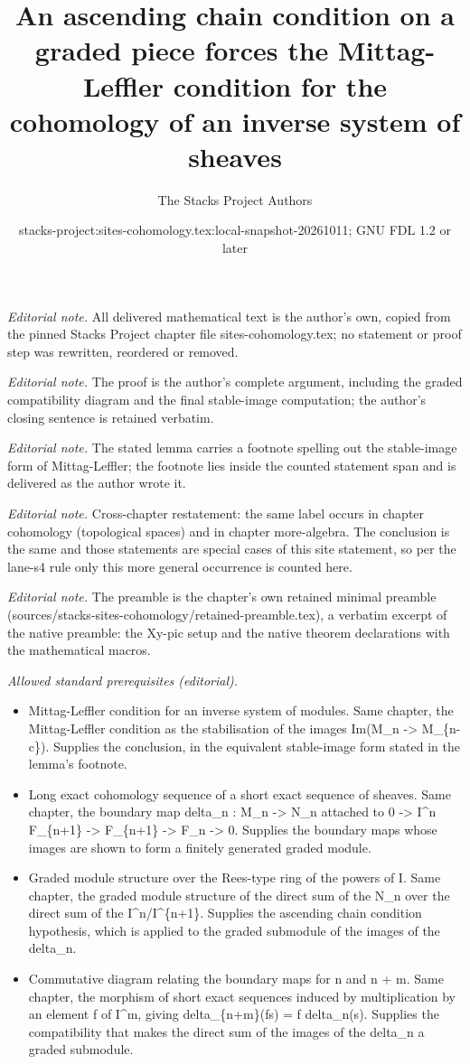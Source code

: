 \documentclass[10pt,a4paper]{amsart}
\title{An ascending chain condition on a graded piece forces the Mittag-Leffler condition for the cohomology of an inverse system of sheaves}
\author{The Stacks Project Authors}
\date{stacks-project:sites-cohomology.tex:local-snapshot-20261011; GNU FDL 1.2 or later}
\theoremstyle{plain}
\theoremstyle{definition}
\theoremstyle{remark}
\numberwithin{equation}{subsection}
\begin{document}
\maketitle
\noindent\textit{Editorial note.} All delivered mathematical text is the author's own, copied from the pinned Stacks Project chapter file sites-cohomology.tex; no statement or proof step was rewritten, reordered or removed.\par\medskip
\noindent\textit{Editorial note.} The proof is the author's complete argument, including the graded compatibility diagram and the final stable-image computation; the author's closing sentence is retained verbatim.\par\medskip
\noindent\textit{Editorial note.} The stated lemma carries a footnote spelling out the stable-image form of Mittag-Leffler; the footnote lies inside the counted statement span and is delivered as the author wrote it.\par\medskip
\noindent\textit{Editorial note.} Cross-chapter restatement: the same label occurs in chapter cohomology (topological spaces) and in chapter more-algebra. The conclusion is the same and those statements are special cases of this site statement, so per the lane-s4 rule only this more general occurrence is counted here.\par\medskip
\noindent\textit{Editorial note.} The preamble is the chapter's own retained minimal preamble (sources/stacks-sites-cohomology/retained-preamble.tex), a verbatim excerpt of the native preamble: the Xy-pic setup and the native theorem declarations with the mathematical macros.\par\medskip
\noindent\textit{Allowed standard prerequisites (editorial).}\begin{itemize}
\item Mittag-Leffler condition for an inverse system of modules. Same chapter, the Mittag-Leffler condition as the stabilisation of the images Im(M\_n -> M\_\{n-c\}). Supplies the conclusion, in the equivalent stable-image form stated in the lemma's footnote.
\item Long exact cohomology sequence of a short exact sequence of sheaves. Same chapter, the boundary map delta\_n : M\_n -> N\_n attached to 0 -> I\textasciicircum{}n F\_\{n+1\} -> F\_\{n+1\} -> F\_n -> 0. Supplies the boundary maps whose images are shown to form a finitely generated graded module.
\item Graded module structure over the Rees-type ring of the powers of I. Same chapter, the graded module structure of the direct sum of the N\_n over the direct sum of the I\textasciicircum{}n/I\textasciicircum{}\{n+1\}. Supplies the ascending chain condition hypothesis, which is applied to the graded submodule of the images of the delta\_n.
\item Commutative diagram relating the boundary maps for n and n + m. Same chapter, the morphism of short exact sequences induced by multiplication by an element f of I\textasciicircum{}m, giving delta\_\{n+m\}(fs) = f delta\_n(s). Supplies the compatibility that makes the direct sum of the images of the delta\_n a graded submodule.
\end{itemize}\medskip
\end{document}
